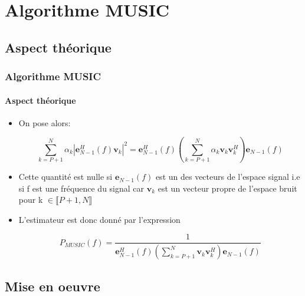 \documentclass[10pt]{beamer}
\begin{document}

\section{Algorithme MUSIC}
\subsection{Aspect théorique}


\begin{frame}

\frametitle{Algorithme MUSIC}
\framesubtitle{Aspect théorique}

\begin{itemize}
  
  \item On pose alors:
  
  { \fontsize{8.5}{10}\selectfont
  
  \begin{equation}
%
\label{eq:basemusic}
\sum_{k=P+1}^{N} \alpha _k \left| \boldsymbol{e}_{N-1}^H (f) \boldsymbol{v}_k \right| ^2 = \boldsymbol{e}_{N-1}^H (f) \left( \sum_{k=P+1}^{N} \alpha _k  \boldsymbol{v}_{k}\boldsymbol{v}_k^H \right) \boldsymbol{e}_{N-1} (f)
%
\end{equation}
}

\item Cette quantité est nulle si \(\boldsymbol{e}_{N-1}(f)\) est un des vecteurs de l'espace signal i.e si f est une fréquence du signal car \(\boldsymbol{v}_k \) est un vecteur propre de l'espace bruit pour k \( \in \llbracket P+1,N \rrbracket \)

\item L'estimateur est donc donné par l'expression

\begin{equation}
%
\label{eq:music}
P_{MUSIC} (f) = \frac{1}{\boldsymbol{e}_{N-1}^H (f) \left( \sum_{k=P+1}^{N}   \boldsymbol{v}_{k}\boldsymbol{v}_k^H \right) \boldsymbol{e}_{N-1} (f)}
%
\end{equation}

\end{itemize}
\end{frame}







\subsection{Mise en oeuvre}
\end{document}

